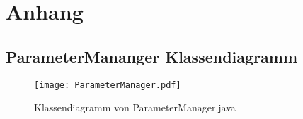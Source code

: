
\chapter{Anhang}

		
%

\newpage
\section{ParameterMananger Klassendiagramm}\label{A.PM.Diagramm}
\begin{figure}[h!]
  \begin{center}
    \texttt{[image: ParameterManager.pdf]}
  		  \caption{Klassendiagramm von ParameterManager.java}
     \label{ttn.DoorsConnetor}
  \end{center}
\end{figure}

%
%		
%
